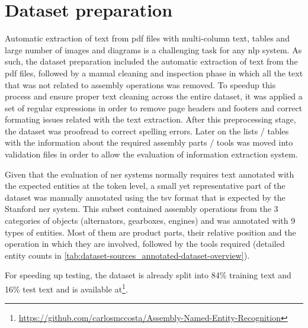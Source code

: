 \section{Dataset preparation}\label{sec:dataset-preparation}

Automatic extraction of text from \gls{pdf} files with multi-column text, tables and large number of images and diagrams is a challenging task for any \gls{nlp} system. As such, the dataset preparation included the automatic extraction of text from the \gls{pdf} files, followed by a manual cleaning and inspection phase in which all the text that was not related to assembly operations was removed. To speedup this process and ensure proper text cleaning across the entire dataset, it was applied a set of regular expressions in order to remove page headers and footers and correct formating issues related with the text extraction. After this preprocessing stage, the dataset was proofread to correct spelling errors. Later on the lists / tables with the information about the required assembly parts / tools was moved into validation files in order to allow the evaluation of information extraction system.

Given that the evaluation of \gls{ner} systems normally requires text annotated with the expected entities at the token level, a small yet representative part of the dataset was manually annotated using the \gls{tsv} format that is expected by the Stanford \gls{ner} system. This subset contained assembly operations from the 3 categories of objects (alternators, gearboxes, engines) and was annotated with 9 types of entities. Most of them are product parts, their relative position and the operation in which they are involved, followed by the tools required (detailed entity counts in \cref{tab:dataset-sources_annotated-dataset-overview}).

For speeding up testing, the dataset is already split into 84\% training text and 16\% test text and is available at\footnote{\url{https://github.com/carlosmccosta/Assembly-Named-Entity-Recognition}}.

